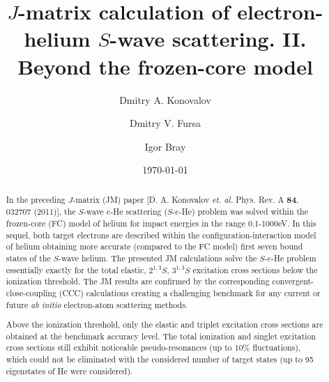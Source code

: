 \documentclass[aip
, pra
, showpacs
, aps
, twocolumn
, groupedaddress
, floatfix
]{revtex4}
\begin{document}
\title {$J$-matrix calculation of electron-helium $S$-wave scattering. II. Beyond the frozen-core model}

\author{Dmitry A. Konovalov}

\author{Dmitry V. Fursa}

\author{Igor Bray}



\date{\today}

\begin{abstract}

In the preceding $J$-matrix (JM) paper [D. A. Konovalov {\em et. al.} Phys. Rev. A {\bf 84}, 032707 (2011)],
the $S$-wave $e$-He scattering ($S$-$e$-He) problem was solved within the frozen-core (FC) model of helium for impact energies in the range 0.1-1000eV.
In this sequel, both target electrons are described within the configuration-interaction model of helium obtaining  more accurate (compared to the FC model)
first seven bound states of the $S$-wave helium.
The presented JM calculations solve the $S$-$e$-He problem essentially exactly
for the total elastic, $2^{1,3}S$, $3^{1,3}S$ excitation cross sections below the ionization threshold.
The JM results are confirmed by the corresponding convergent-close-coupling (CCC) calculations creating a challenging benchmark
for any current or future {\it ab initio} electron-atom scattering methods.

Above the ionization threshold, only the elastic and triplet excitation cross sections are obtained at the benchmark accuracy level.
The total ionization and singlet excitation cross sections still exhibit noticeable pseudo-resonances (up to 10\% fluctuations),
which could not be eliminated with the considered number of target states (up to 95 eigenstates of He were considered).


\end{abstract}

\maketitle
\end{document}

